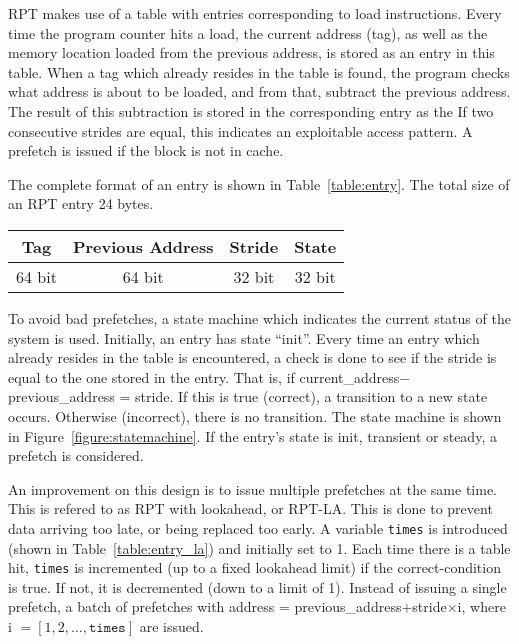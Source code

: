 RPT makes use of a table with entries corresponding to load
instructions. Every time the program counter hits a load, the current
address (tag), as well as the memory location loaded from the previous
address, is stored as an entry in this table. When a tag which already
resides in the table is found, the program checks what address is
about to be loaded, and from that, subtract the previous address. The
result of this subtraction is stored in the corresponding entry as the
If two consecutive strides are equal, this indicates an exploitable
access pattern. A prefetch is issued if the block is not in cache.

The complete format of an entry is shown in
Table~\ref{table:entry}. The total size of an RPT entry 24 bytes.

\begin{center}
  \begin{tabular}{ | c | c | c | c |}
    \hline
    Tag & Previous Address & Stride & State \\ \hline
    64 bit & 64 bit & 32 bit & 32 bit \\ \hline
  \end{tabular}
  \label{table:entry}
\end{center}

To avoid bad prefetches, a state machine which indicates the current
status of the system is used. Initially, an entry has state
``init''. Every time an entry which already resides in the table is
encountered, a check is done to see if the stride is equal to the one
stored in the entry. That is, if current\_address$ -
$previous\_address = stride. If this is true (correct), a transition
to a new state occurs. Otherwise (incorrect), there is no
transition. The state machine is shown in
Figure~\ref{figure:statemachine}. If the entry's state is init,
transient or steady, a prefetch is considered.

An improvement on this design is to issue multiple prefetches at the
same time. This is refered to as RPT with lookahead, or RPT-LA. This
is done to prevent data arriving too late, or being replaced too
early. A variable \texttt{times} is introduced (shown in
Table~\ref{table:entry_la}) and initially set to 1. Each time there is
a table hit, \texttt{times} is incremented (up to a fixed lookahead
limit) if the correct-condition is true. If not, it is decremented
(down to a limit of 1). Instead of issuing a single prefetch, a batch
of prefetches with address = previous\_address$ + $stride$\times$i,
where i $= [1, 2, \ldots, \texttt{times}]$ are issued.

